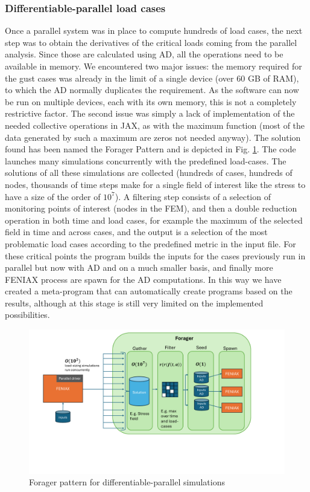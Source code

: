 \documentclass[11pt]{article}
\begin{document}
\subsubsection{Differentiable-parallel load cases}
\label{sec:org7e8990d}
Once a parallel system was in place to compute hundreds of load cases, the next step was to obtain the derivatives of the critical loads coming from the parallel analysis. Since those are calculated using AD, all the operations need to be available in memory.
We encountered two major issues: the memory required for the gust cases was already in the limit of a single device (over 60 GB of RAM), to which the AD normally duplicates the requirement. As the software can now be run on multiple devices, each with its own memory, this is not a completely restrictive factor. The second issue was simply a lack of implementation of the needed collective operations in JAX, as with the maximum function (most of the data generated by such a maximum are zeros not needed anyway). The solution found has been named the Forager Pattern and is depicted in Fig. \ref{fig:org8dc1175}. The code launches many simulations concurrently with the predefined load-cases. The solutions of all these simulations are collected (hundreds of cases, hundreds of nodes, thousands of time steps make for a single field of interest like the stress to have a size of the order of \(10^7\)). A filtering step consists of a selection of monitoring points of interest (nodes in the FEM), and then a double reduction operation in both time and load cases, for example the maximum of the selected field in time and across cases, and the output is a selection of the most problematic load cases according to the predefined metric in the input file. For these critical points the program builds the inputs for the cases previously run in parallel but now with AD and on a much smaller basis, and finally more FENIAX process are spawn for the AD computations. In this way we have created a meta-program that can automatically create programs based on the results, although at this stage is still  very limited on the implemented possibilities.

\begin{figure}[!h]
\centering
\includegraphics[width=1\textwidth]{figs_ext/forager.pdf}
\caption{\label{fig:org8dc1175}Forager pattern for differentiable-parallel simulations}
\end{figure}
\end{document}
